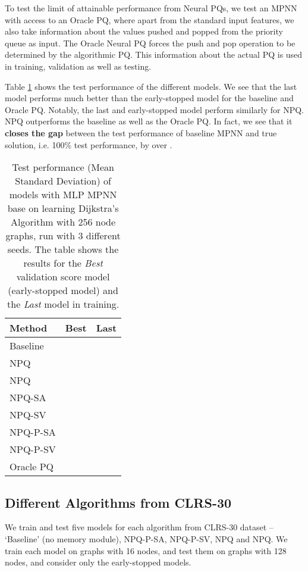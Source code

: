 \documentclass{article}
\theoremstyle{plain}
\theoremstyle{definition}
\theoremstyle{remark}
\begin{document}
To test the limit of attainable performance from Neural PQs, we test an MPNN with access
to an Oracle PQ, where apart from the standard input features,
we also take information about the values pushed and popped from the priority queue as input.
The Oracle Neural PQ forces the push and pop operation to be determined by the algorithmic PQ.
This information about the actual PQ is used in training, validation as well as testing.

Table \ref{table:dijkstra-oracle-evals} shows the test performance of the different models.
We see that the last model performs much better than the early-stopped model for the baseline and Oracle PQ.
Notably, the last and early-stopped model perform similarly for NPQ. NPQ
outperforms the baseline as well as the Oracle PQ.
In fact, we see that it \textbf{closes the gap} between the test performance of baseline MPNN and true solution,
i.e. 100\% test performance, by over .

\begin{table}[tbh]
\centering
\caption{Test performance (Mean  Standard Deviation) of models with MLP MPNN base on
learning Dijkstra's Algorithm with 256 node graphs, run with 3 different seeds.
The table shows the results for the \emph{Best} validation score model (early-stopped model)
and the \emph{Last} model in training.}
\begin{tabular}{lll}
    \hline
    \centering \bfseries Method & \bfseries Best & \bfseries Last \\
    \hline
    Baseline &  &  \\
    NPQ &  &  \\
    NPQ &  &  \\
    NPQ-SA &  &  \\
    NPQ-SV &  &  \\
    NPQ-P-SA &  &  \\
    NPQ-P-SV &  &  \\
    \hline
    \hline
    Oracle PQ  &  &  \\
    \hline
\end{tabular}
\label{table:dijkstra-oracle-evals}
\end{table}







\subsection{Different Algorithms from CLRS-30}
\label{sec:eval-all-algs}
We train and test five models for each algorithm from CLRS-30 dataset --
`Baseline' (no memory module), NPQ\nobreakdash-P\nobreakdash-SA, NPQ\nobreakdash-P\nobreakdash-SV, NPQ and NPQ.
We train each model on graphs with 16 nodes, and test them on graphs with 128 nodes, and consider only the early-stopped models.
\end{document}

